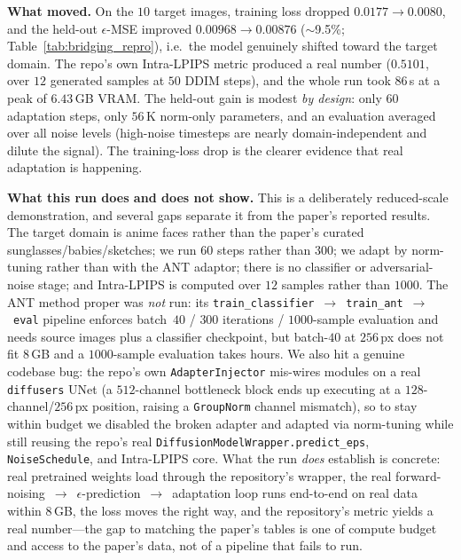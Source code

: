 \documentclass[11pt]{article}
\begin{document}
\textbf{What moved.} On the $10$ target images, training loss dropped
$0.0177 \rightarrow 0.0080$, and the held-out $\epsilon$-MSE improved
$0.00968 \rightarrow 0.00876$ ($\sim$9.5\%; Table~\ref{tab:bridging_repro}),
i.e.\ the model genuinely shifted toward the target domain. The repo's own
Intra-LPIPS metric produced a real number ($0.5101$, over $12$ generated
samples at $50$ DDIM steps), and the whole run took $86$\,s at a peak of
$6.43$\,GB VRAM. The held-out gain is modest \emph{by design}: only $60$
adaptation steps, only $56$\,K norm-only parameters, and an evaluation
averaged over all noise levels (high-noise timesteps are nearly
domain-independent and dilute the signal). The training-loss drop is the
clearer evidence that real adaptation is happening.

\textbf{What this run does and does not show.} This is a deliberately
reduced-scale demonstration, and several gaps separate it from the paper's
reported results. The target domain is anime faces rather than the paper's
curated sunglasses/babies/sketches; we run $60$ steps rather than $300$;
we adapt by norm-tuning rather than with the ANT adaptor; there is no
classifier or adversarial-noise stage; and Intra-LPIPS is computed over
$12$ samples rather than $1000$. The ANT method proper was \emph{not} run:
its \texttt{train\_classifier}~$\rightarrow$~\texttt{train\_ant}~$\rightarrow$~\texttt{eval}
pipeline enforces batch~$40$ / $300$ iterations / $1000$-sample
evaluation and needs source images plus a classifier checkpoint, but
batch-$40$ at $256$\,px does not fit $8$\,GB and a $1000$-sample
evaluation takes hours. We also hit a genuine codebase bug: the repo's own
\texttt{AdapterInjector} mis-wires modules on a real \texttt{diffusers}
UNet (a $512$-channel bottleneck block ends up executing at a
$128$-channel/$256$\,px position, raising a \texttt{GroupNorm} channel
mismatch), so to stay within budget we disabled the broken adapter and
adapted via norm-tuning while still reusing the repo's real
\texttt{DiffusionModelWrapper.predict\_eps}, \texttt{NoiseSchedule}, and
Intra-LPIPS core. What the run \emph{does} establish is concrete: real
pretrained weights load through the repository's wrapper, the real
forward-noising~$\rightarrow$~$\epsilon$-prediction~$\rightarrow$~adaptation
loop runs end-to-end on real data within $8$\,GB, the loss moves the right
way, and the repository's metric yields a real number---the gap to
matching the paper's tables is one of compute budget and access to the
paper's data, not of a pipeline that fails to run.
\end{document}
